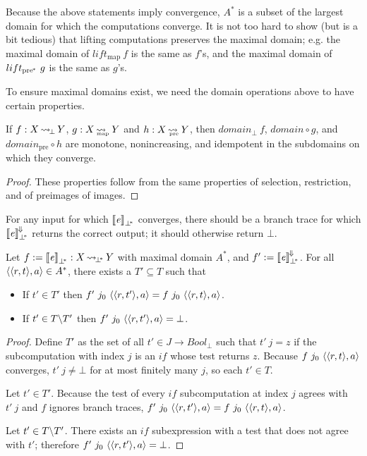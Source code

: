 \documentclass[preprint]{sigplanconf}
\newcommand{\arrow}{\rightsquigarrow}
\newcommand{\conv}{^{\mspace{-2mu}\Downarrow\mspace{-2mu}}}
\newcommand{\meaningofconv}[1]{\left\llbracket{#1}\right\rrbracket\conv}
\newcommand{\arrowlift}{\ensuremath{lift}}
\DeclareMathOperator{\botto}{\arrow_{\mspace{-3mu}\bot}}
\newcommand{\map}{_\mathrm{map}}
\DeclareMathOperator{\mapto}{\arrow_{\mspace{-21mu}\map}}
\newcommand{\liftmap}{\arrowlift\map}
\newcommand{\pre}{_\mathrm{pre}}
\DeclareMathOperator{\preto}{\arrow_{\mspace{-19mu}\pre}}
\newcommand{\pbot}{{\bot^{\mspace{-4mu}*}}}
\DeclareMathOperator{\pbotto}{\arrow_{\mspace{-3mu}\pbot}}
\newcommand{\ppre}{_\mathrm{pre^{\mspace{-2mu}*}}}
\newcommand{\liftppre}{\arrowlift\ppre}
\begin{document}
Because the above statements imply convergence, $A^*$ is a subset of the largest domain for which the computations converge.
It is not too hard to show (but is a bit tedious) that lifting computations preserves the maximal domain; e.g. the maximal domain of $\liftmap~f$ is the same as $f$'s, and the maximal domain of $\liftppre~g$ is the same as $g$'s.

To ensure maximal domains exist, we need the domain operations above to have certain properties.

\begin{theorem}
If $f : X \botto Y$, $g : X \mapto Y$ and $h : X \preto Y$, then $domain_\bot~f$, $domain \circ g$, and $domain\pre \circ h$ are monotone, nonincreasing, and idempotent in the subdomains on which they converge.
\label{thm:domain-closure-operators}
\end{theorem}
\begin{proof}
These properties follow from the same properties of selection, restriction, and of preimages of images.
\end{proof}

For any input for which $\meaningof{\mathit{e}}_\pbot$ converges, there should be a branch trace for which $\meaningofconv{\mathit{e}}_\pbot$ returns the correct output; it should otherwise return $\bot$.

\begin{theorem}
Let $f := \meaningof{\mathit{e}}_\pbot : X \pbotto Y$ with maximal domain $A^*$, and $f' := \meaningofconv{\mathit{e}}_\pbot$.
For all $\langle{\langle{r,t}\rangle,a}\rangle \in A^*$, there exists a $T' \subseteq T$ such that
\begin{itemize}
	\item If $t' \in T'$ then $f'~j_0~\langle{\langle{r,t'}\rangle,a}\rangle = f~j_0~\langle{\langle{r,t}\rangle,a}\rangle$.
	\item If $t' \in T \backslash T'$ then $f'~j_0~\langle{\langle{r,t'}\rangle,a}\rangle = \bot$.
\end{itemize}
\end{theorem}
\begin{proof}
Define $T'$ as the set of all $t' \in J \to Bool_\bot$ such that $t'~j = z$ if the subcomputation with index $j$ is an $if$ whose test returns $z$.
Because $f~j_0~\langle{\langle{r,t}\rangle,a}\rangle$ converges, $t'~j \neq \bot$ for at most finitely many $j$, so each $t' \in T$.

Let $t' \in T'$.
Because the test of every $if$ subcomputation at index $j$ agrees with $t'~j$ and $f$ ignores branch traces, $f'~j_0~\langle{\langle{r,t'}\rangle,a}\rangle = f~j_0~\langle{\langle{r,t}\rangle,a}\rangle$.

Let $t' \in T \backslash T'$.
There exists an $if$ subexpression with a test that does not agree with $t'$; therefore $f'~j_0~\langle{\langle{r,t'}\rangle,a}\rangle = \bot$.
\end{proof}
\end{document}
